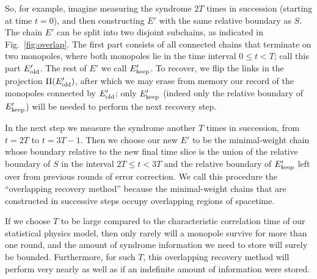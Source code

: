 So, for example, imagine measuring the syndrome $2T$ times in succession (starting at time $t=0$), and then constructing $E'$ with the same relative boundary as $S$. The chain $E'$ can be split into two disjoint subchains, as indicated in Fig.~\ref{fig:overlap}. The first part consists of all connected chains that terminate on two monopoles, where  both monopoles lie in the time interval $0\le t < T$; call this part $E'_{\rm old}$. The rest of $E'$ we call $E'_{\rm keep}$. To recover, we flip the links in the projection $\Pi(E'_{\rm old})$, after which we may erase from memory our record of the monopoles connected by $E'_{\rm old}$; only $E'_{\rm keep}$ (indeed only the relative boundary of $E'_{\rm keep}$) will be needed to perform the next recovery step.

In the next step we measure the syndrome another $T$ times in succession, from $t=2T$ to $t=3T-1$. Then we choose our new $E'$ to be the minimal-weight chain whose boundary relative to the new final time slice is the union of the relative boundary of $S$ in the interval $2T \le t < 3T$ and the relative boundary of $E'_{\rm keep}$ left over from previous rounds of error correction. We call this procedure the ``overlapping recovery method'' because the minimal-weight chains that are constructed in successive steps occupy overlapping regions of spacetime.

If we choose $T$ to be large compared to the characteristic correlation time of our statistical physics model, then only rarely will a monopole survive for more than one round, and the amount of syndrome information we need to store will surely be bounded. Furthermore, for such $T$, this overlapping recovery method will perform very nearly as well as if an indefinite amount of information were stored.

